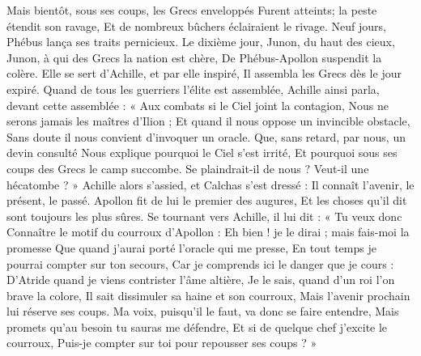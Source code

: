 \documentclass{article}
\begin{document}
{{Mais bientôt, sous ses coups, les Grecs enveloppés
Furent atteints; la peste étendit son ravage,
Et de nombreux bûchers éclairaient le rivage.
Neuf jours, Phébus lança ses traits pernicieux.
Le dixième jour, Junon, du haut des cieux,
Junon, à qui des Grecs la nation est chère,
De Phébus-Apollon suspendit la colère.
Elle se sert d'Achille, et par elle inspiré,
Il assembla les Grecs dès le jour expiré.
Quand de tous les guerriers l'élite est assemblée,
Achille ainsi parla, devant cette assemblée :
« Aux combats si le Ciel joint la contagion,
Nous ne serons jamais les maîtres d'Ilion ;
Et quand il nous oppose un invincible obstacle,
Sans doute il nous convient d'invoquer un oracle.
Que, sans retard, par nous, un devin consulté
Nous explique pourquoi le Ciel s'est irrité,
Et pourquoi sous ses coups des Grecs le camp succombe.
Se plaindrait-il de nous ? Veut-il une hécatombe ? »
Achille alors s'assied, et Calchas s'est dressé :
Il connaît l'avenir, le présent, le passé.
Apollon fit de lui le premier des augures,
Et les choses qu'il dit sont toujours les plus sûres.
Se tournant vers Achille, il lui dit : « Tu veux donc
Connaître le motif du courroux d'Apollon :
Eh bien ! je le dirai ; mais fais-moi la promesse
Que quand j'aurai porté l'oracle qui me presse,
En tout temps je pourrai compter sur ton secours,
Car je comprends ici le danger que je cours :
D'Atride quand je viens contrister l’âme altière,
Je le sais, quand d'un roi l'on brave la colore,
Il sait dissimuler sa haine et son courroux,
Mais l'avenir prochain  lui réserve ses coups.
Ma voix, puisqu'il le faut, va donc se faire entendre,
Mais promets qu'au besoin tu sauras me défendre,
Et si de quelque chef j'excite le courroux,
Puis-je compter sur toi pour repousser ses coups ? »
}}
\end{document}
